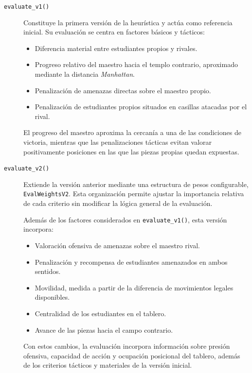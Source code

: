 \begin{description}
    \item[\texttt{evaluate\_v1()}] Constituye la primera versión de la heurística y actúa como referencia inicial. Su evaluación se centra en factores básicos y tácticos:
    \begin{itemize}
        \item Diferencia material entre estudiantes propios y rivales.
        \item Progreso relativo del maestro hacia el templo contrario, aproximado mediante la distancia \textit{Manhattan}.
        \item Penalización de amenazas directas sobre el maestro propio.
        \item Penalización de estudiantes propios situados en casillas atacadas por el rival.
    \end{itemize}

    El progreso del maestro aproxima la cercanía a una de las condiciones de victoria, mientras que las penalizaciones tácticas evitan valorar positivamente posiciones en las que las piezas propias quedan expuestas.

    \item[\texttt{evaluate\_v2()}] Extiende la versión anterior mediante una estructura de pesos configurable, \texttt{EvalWeightsV2}. Esta organización permite ajustar la importancia relativa de cada criterio sin modificar la lógica general de la evaluación.

    Además de los factores considerados en \texttt{evaluate\_v1()}, esta versión incorpora:
    \begin{itemize}
        \item Valoración ofensiva de amenazas sobre el maestro rival.
        \item Penalización y recompensa de estudiantes amenazados en ambos sentidos.
        \item Movilidad, medida a partir de la diferencia de movimientos legales disponibles.
        \item Centralidad de los estudiantes en el tablero.
        \item Avance de las piezas hacia el campo contrario.
    \end{itemize}

    Con estos cambios, la evaluación incorpora información sobre presión ofensiva, capacidad de acción y ocupación posicional del tablero, además de los criterios tácticos y materiales de la versión inicial.


\end{description}
